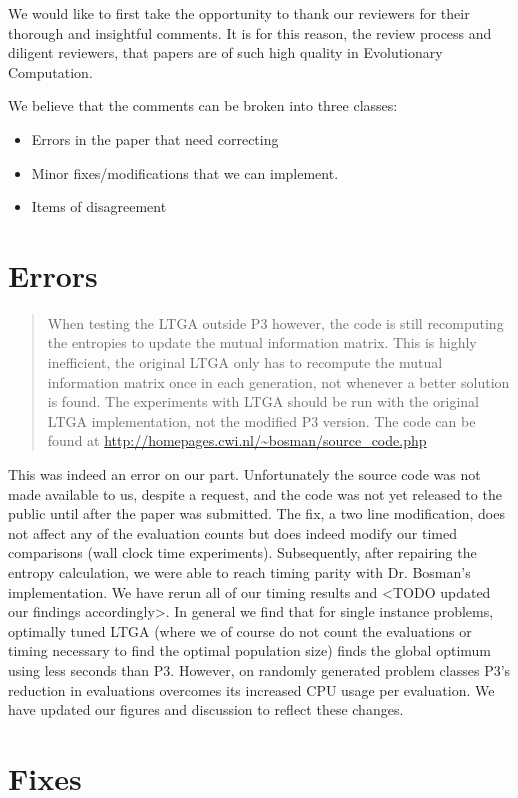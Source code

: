 \documentclass[]{article}
\begin{document}
We would like to first take the opportunity to thank our reviewers for their thorough and insightful comments. It is for this reason, the review process and diligent reviewers, that papers are of such high quality in Evolutionary Computation.

We believe that the comments can be broken into three classes:
\begin{itemize}
\item Errors in the paper that need correcting
\item Minor fixes/modifications that we can implement.
\item Items of disagreement
\end{itemize}

\section{Errors}
\begin{quote}
 When testing the LTGA outside P3 however, the code is still recomputing the entropies to update the mutual information matrix. This is highly inefficient, the original LTGA only has to recompute the mutual information matrix once in each generation, not whenever a better solution is found. The experiments with LTGA should be run with the original LTGA implementation, not the modified P3 version. The code can be found at \url{http://homepages.cwi.nl/~bosman/source_code.php}
\end{quote}

This was indeed an error on our part. Unfortunately the source code was not made available to us, despite a request, and the code was not yet released to the public until after the paper was submitted. The fix, a two line modification, does not affect any of the evaluation counts but does indeed modify our timed comparisons (wall clock time experiments). Subsequently, after repairing the entropy calculation, we were able to reach timing parity with Dr. Bosman's implementation. We have rerun all of our timing results and <TODO updated our findings accordingly>. In general we find that for single instance problems, optimally tuned LTGA (where we of course do not count the evaluations or timing necessary to find the optimal population size) finds the global optimum using less seconds than P3. However, on randomly generated problem classes P3's reduction in evaluations overcomes its increased CPU usage per evaluation. We have updated our figures and discussion to reflect these changes.

\section{Fixes}
\end{document}
